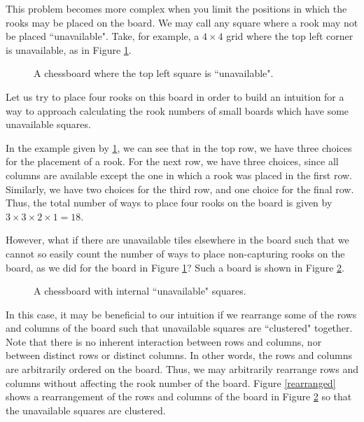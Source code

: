 \documentclass{article}
\newcommand{\w}{0.5}
\newcommand{\ww}{0.25}
\newcommand{\drawgraygrid}[2]{\fill[fill=gray!40!white] (0,0) rectangle (#1*\w,#2*\w); \draw[step=\w cm,black,thin] (0,0) grid (#1*\w,#2*\w);}
\newcommand{\labelcol}[2]{\draw (#1*\w cm - \ww cm, 0 cm) node[anchor=north] {#2};}
\newcommand{\labelrow}[2]{\draw (0 cm, #1*\w cm - \ww cm) node[anchor=east] {#2};}
\newcommand{\unshadesquare}[2]{\filldraw[fill=white, draw=black] (#1*\w - \w,#2*\w - \w) rectangle (#1*\w,#2*\w);}
\begin{document}
This problem becomes more complex when you limit the positions in which the rooks may be placed on the board. We may call any square where a rook may not be placed ``unavailable". Take, for example, a $4\times4$ grid where the top left corner is unavailable, as in Figure \ref{topleftunavailable}.
\begin{figure}[!h]
    \centering
    \caption{A chessboard where the top left square is ``unavailable".}
    \label{topleftunavailable}
\end{figure}

Let us try to place four rooks on this board in order to build an intuition for a way to approach calculating the rook numbers of small boards which have some unavailable squares.

In the example given by \ref{topleftunavailable}, we can see that in the top row, we have three choices for the placement of a rook. For the next row, we have three choices, since all columns are available except the one in which a rook was placed in the first row. Similarly, we have two choices for the third row, and one choice for the final row. Thus, the total number of ways to place four rooks on the board is given by $3\times3\times2\times1=18$.

However, what if there are unavailable tiles elsewhere in the board such that we cannot so easily count the number of ways to place non-capturing rooks on the board, as we did for the board in Figure \ref{topleftunavailable}? Such a board is shown in Figure \ref{internal}.

\begin{figure}[h!]
    \centering
    \caption{A chessboard with internal ``unavailable" squares.}
    \label{internal}
\end{figure}

In this case, it may be beneficial to our intuition if we rearrange some of the rows and columns of the board such that unavailable squares are ``clustered" together. Note that there is no inherent interaction between rows and columns, nor between distinct rows or distinct columns. In other words, the rows and columns are arbitrarily ordered on the board. Thus, we may arbitrarily rearrange rows and columns without affecting the rook number of the board. Figure \ref{rearranged} shows a rearrangement of the rows and columns of the board in Figure \ref{internal} so that the unavailable squares are clustered.
\end{document}
